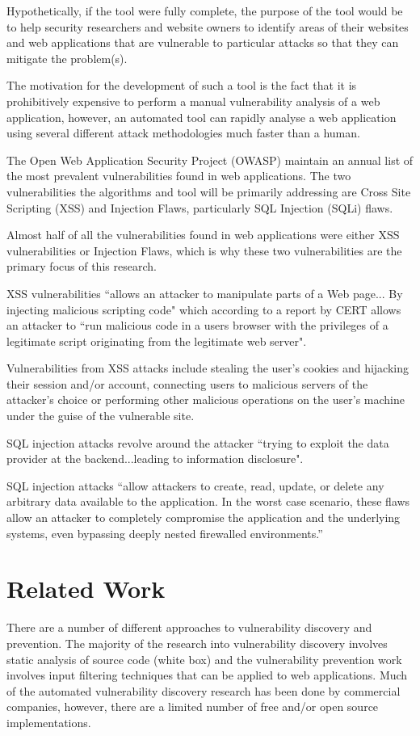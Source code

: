 \documentclass[12pt,a4paper]{article}
\begin{document}
Hypothetically, if the tool were fully complete, the purpose of the tool would be to help security researchers and website owners to identify areas of their websites and web applications that are vulnerable to particular attacks so that they can mitigate the problem(s).

The motivation for the development of such a tool is the fact that it is prohibitively expensive to perform a manual vulnerability analysis of a web application, however, an automated tool can rapidly analyse a web application using several different attack methodologies much faster than a human.

The Open Web Application Security Project (OWASP) maintain an annual list of the most prevalent vulnerabilities found in web applications. \cite{OWASP:2007:Online} The two vulnerabilities the algorithms and tool will be primarily addressing are Cross Site Scripting (XSS) and Injection Flaws, particularly SQL Injection (SQLi) flaws.

Almost half of all the vulnerabilities found in web applications were either XSS vulnerabilities or Injection Flaws, which is why these two vulnerabilities are the primary focus of this research. \cite{OWASP:2007:Online}

XSS vulnerabilities ``allows an attacker to manipulate parts of a Web page... By injecting malicious scripting code" \cite{Holz2006} which according to a report by CERT allows an attacker to ``run malicious code in a users browser with the privileges of a legitimate script originating from the legitimate web server". \cite{Rafail:2001:Online}

Vulnerabilities from XSS attacks include stealing the user's cookies and hijacking their session and/or account, connecting users to malicious servers of the attacker's choice or performing other malicious operations on the user's machine under the guise of the vulnerable site. \cite{Lee:2002:Online}

SQL injection attacks revolve around the attacker ``trying to exploit the data provider at the backend...leading to information disclosure". \cite{Holz2006}

SQL injection attacks “allow attackers to create, read, update, or delete any arbitrary data available to the application. In the worst case scenario, these flaws allow an attacker to completely compromise the application and the underlying systems, even bypassing deeply nested firewalled environments.” \cite{OWASP:2007:Online} 

\section{Related Work}
There are a number of different approaches to vulnerability discovery and prevention.  The majority of the research into vulnerability discovery involves static analysis of source code (white box) and the vulnerability prevention work involves input filtering techniques that can be applied to web applications.
Much of the automated vulnerability discovery research has been done by commercial companies, however, there are a limited number of free and/or open source implementations.
\end{document}
